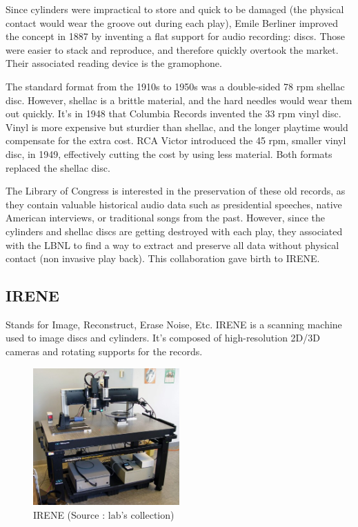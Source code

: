 \documentclass[12pt, twoside]{article}
\begin{document}
Since cylinders were impractical to store and quick to be damaged (the physical contact would wear the groove out during each play), Emile Berliner improved the concept in 1887 by inventing a flat support for audio recording: discs. Those were easier to stack and reproduce, and therefore quickly overtook the market. Their associated reading device is the gramophone.

The standard format from the 1910s to 1950s was a double-sided 78 rpm shellac disc. However, shellac is a brittle material, and the hard needles would wear them out quickly. It's in 1948 that Columbia Records invented the 33 rpm vinyl disc. Vinyl is more expensive but sturdier than shellac, and the longer playtime would compensate for the extra cost. RCA Victor introduced the 45 rpm, smaller vinyl disc, in 1949, effectively cutting the cost by using less material. Both formats replaced the shellac disc.

The Library of Congress is interested in the preservation of these old records, as they contain valuable historical audio data such as presidential speeches, native American interviews, or traditional songs from the past. However, since the cylinders and shellac discs are getting destroyed with each play, they associated with the LBNL to find a way to extract and preserve all data without physical contact (non invasive play back). This collaboration gave birth to IRENE.
\subsection{IRENE}
Stands for Image, Reconstruct, Erase Noise, Etc.
IRENE is a scanning machine used to image discs and cylinders. It's composed of high-resolution 2D/3D cameras and rotating supports for the records.

\begin{figure}[H]
	\centering
	\includegraphics[width=0.5\textwidth]{../images/IRENE.jpg}
	\caption{IRENE (Source : lab's collection)}
	\label{irene}
\end{figure}
\end{document}
